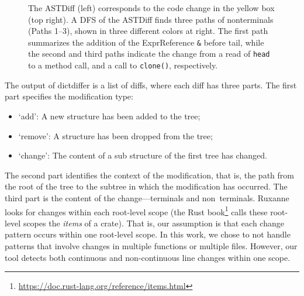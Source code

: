 \begin{figure}[h]
    
    \caption{\label{fig:extraction}The ASTDiff (left) corresponds to the code change in the yellow box (top right). A DFS of the ASTDiff finds three paths of nonterminals (Paths 1--3), shown in three different colors at right. The first path summarizes the addition of the ExprReference {\tt \&} before tail, while the second and third paths indicate the change from a read of \texttt{head} to a method call, and a call to \texttt{clone()}, respectively.}

\end{figure}


The output of dictdiffer is a list of diffs, where each diff has three parts. The first part specifies the modification type:

\begin{itemize}
    \item `add': A new structure has been added to the tree; 
    \item `remove': A structure has been dropped from the tree; 
    \item `change': The content of a sub structure of the first tree has changed.
\end{itemize}

The second part identifies the context of the modification, that is, the path from the root of the tree to the subtree in which the modification has occurred. The third part is the content of the change---terminals and non~terminals. Ruxanne looks for changes within each root-level scope (the Rust book\footnote{\url{https://doc.rust-lang.org/reference/items.html}} calls these root-level scopes the \textit{items} of a crate). That is, our assumption is that each change pattern occurs within one root-level scope. In this work, we chose to not handle patterns that involve changes in multiple functions or multiple files. However, our tool detects both continuous and non-continuous line changes within one scope.

